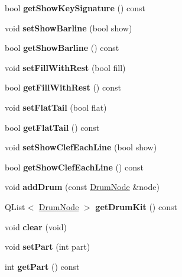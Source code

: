 \begin{DoxyCompactItemize}
bool {\bfseries get\+Show\+Key\+Signature} () const
\item 
\mbox{\label{class_o_v_e_1_1_track_a6122bcf31cecd1331c7acdd52610d5b1}} 
void {\bfseries set\+Show\+Barline} (bool show)
\item 
\mbox{\label{class_o_v_e_1_1_track_a1339531187e78ac8801ebe943362566e}} 
bool {\bfseries get\+Show\+Barline} () const
\item 
\mbox{\label{class_o_v_e_1_1_track_a88a0340207290b06792785a8b238de0c}} 
void {\bfseries set\+Fill\+With\+Rest} (bool fill)
\item 
\mbox{\label{class_o_v_e_1_1_track_a3bcd1a6f70279251216359701f3d621e}} 
bool {\bfseries get\+Fill\+With\+Rest} () const
\item 
\mbox{\label{class_o_v_e_1_1_track_ae917ef1f669a5a3a398c5e44133364d0}} 
void {\bfseries set\+Flat\+Tail} (bool flat)
\item 
\mbox{\label{class_o_v_e_1_1_track_af4c231cc04da601281340bdaffc8cdd5}} 
bool {\bfseries get\+Flat\+Tail} () const
\item 
\mbox{\label{class_o_v_e_1_1_track_ac3e0606e5c8806881b1bb0f84d6461d6}} 
void {\bfseries set\+Show\+Clef\+Each\+Line} (bool show)
\item 
\mbox{\label{class_o_v_e_1_1_track_a51a22c67579643d6e139fadecf7b1b3f}} 
bool {\bfseries get\+Show\+Clef\+Each\+Line} () const
\item 
\mbox{\label{class_o_v_e_1_1_track_a07548576c88d8726f1a1f6d0130b327b}} 
void {\bfseries add\+Drum} (const \hyperlink{struct_o_v_e_1_1_track_1_1_drum_node}{Drum\+Node} \&node)
\item 
\mbox{\label{class_o_v_e_1_1_track_aa0404627445481be9f894ecd4166cf5f}} 
Q\+List$<$ \hyperlink{struct_o_v_e_1_1_track_1_1_drum_node}{Drum\+Node} $>$ {\bfseries get\+Drum\+Kit} () const
\item 
\mbox{\label{class_o_v_e_1_1_track_a2cd1171e5ad7f4ede4b6d28e56b54023}} 
void {\bfseries clear} (void)
\item 
\mbox{\label{class_o_v_e_1_1_track_a30c8e260cf2a1db334ca5ff952094ce5}} 
void {\bfseries set\+Part} (int part)
\item 
\mbox{\label{class_o_v_e_1_1_track_ae7d02510f99828e5a5a3dac3f14fb722}} 
int {\bfseries get\+Part} () const
\end{DoxyCompactItemize}


